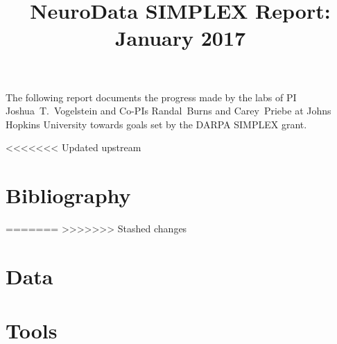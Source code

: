 \documentclass[12pt]{article}
\title{NeuroData SIMPLEX Report: January 2017}
\begin{document}
\renewcommand{\onlyinsubfile}[1]{}
\renewcommand{\notinsubfile}[1]{#1}
\maketitle
\thispagestyle{empty}

The following report documents the progress made by the labs of PI Joshua~T.~Vogelstein and Co-PIs Randal~Burns and Carey~Priebe at Johns Hopkins University towards goals set by the DARPA SIMPLEX grant.

\setcounter{tocdepth}{2}
\tableofcontents


<<<<<<< Updated upstream
\newpage
\section{Bibliography}
\begin{spacing}{0.5}
{\footnotesize
{}
 
% 
=======
%
%
>>>>>>> Stashed changes
}
\end{spacing}

\newpage
\section{Data}

%


\newpage
\section{Tools}
\end{document}

